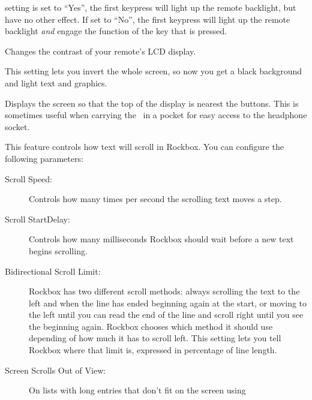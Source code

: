 \begin{description}
{\begin{description}
{          setting is set to ``Yes'', the first keypress will light up the 
          remote backlight, but have no other effect.  If set to ``No'', 
          the first keypress will light up the remote backlight 
          \emph{and} engage the function of the key that is pressed.
       \item[Contrast:]
         Changes the contrast of your remote's LCD display. 
       \item[LCD Mode:]
         This setting lets you invert the whole screen, so now you get a 
         black background and light text and graphics.
       \item[Upside Down:]
         Displays the screen so that the top of the display is nearest 
         the buttons.  This is sometimes useful when carrying the \dap\ in a 
         pocket for easy access to the headphone socket.
      }
    \end{description}
		}
  \item[Scrolling]
    This feature controls how text will scroll in Rockbox. You can configure 
    the following parameters:
    \begin{description}
    \item[Scroll Speed:]
      Controls how many times per second the scrolling text moves a step.
    \item[Scroll StartDelay:]
      Controls how many milliseconds Rockbox should wait before a new 
      text begins scrolling.
    \item[Bidirectional Scroll Limit:]
      Rockbox has two different scroll methods: always scrolling the text 
      to the left and when the line has ended beginning again at the start, 
      or moving to the left until you can read the end of the line and scroll 
      right until you see the beginning again. Rockbox chooses which method 
      it should use depending of how much it has to scroll left. This setting 
      lets you tell Rockbox where that limit is, expressed in percentage of 
      line length.
    \item[Screen Scrolls Out of View:]
      On lists with long entries that don't fit on the screen using 
\end{description}
\end{description}
